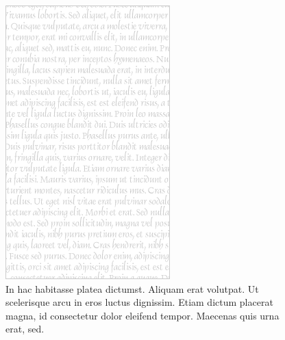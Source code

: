\begin{figure}[t]
\begin{minipage}{.49\linewidth}
    \includegraphics[width=\linewidth]{figs/vertical-rectangle-white}
  \end{minipage}
  \caption[In hac habitasse platea dictumst]{
    In hac habitasse platea dictumst.
Aliquam erat volutpat.
Ut scelerisque arcu in eros luctus dignissim.
Etiam dictum placerat magna, id consectetur dolor eleifend tempor.
Maecenas quis urna erat, sed.
  }
\end{figure}

